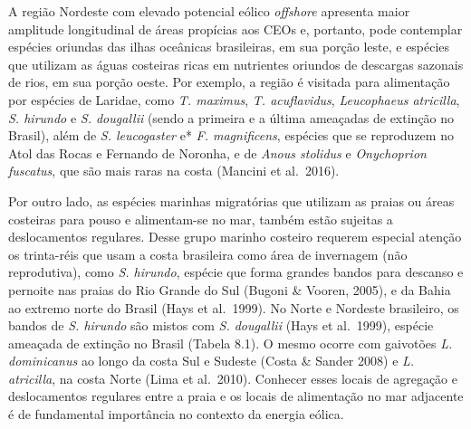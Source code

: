\documentclass[
  oneside]{scrbook}
\begin{document}
A região Nordeste com elevado potencial eólico \emph{offshore} apresenta maior amplitude longitudinal de áreas propícias aos CEOs e, portanto, pode contemplar espécies oriundas das ilhas oceânicas brasileiras, em sua porção leste, e espécies que utilizam as águas costeiras ricas em nutrientes oriundos de descargas sazonais de rios, em sua porção oeste. Por exemplo, a região é visitada para alimentação por espécies de Laridae, como \emph{T. maximus}, \emph{T. acuflavidus}, \emph{Leucophaeus atricilla}, \emph{S. hirundo} e \emph{S. dougallii} (sendo a primeira e a última ameaçadas de extinção no Brasil), além de \emph{S. leucogaster} e* \emph{F. magnificens}, espécies que se reproduzem no Atol das Rocas e Fernando de Noronha, e de \emph{Anous stolidus} e \emph{Onychoprion fuscatus}, que são mais raras na costa (Mancini et al.~2016).

Por outro lado, as espécies marinhas migratórias que utilizam as praias ou áreas costeiras para pouso e alimentam-se no mar, também estão sujeitas a deslocamentos regulares. Desse grupo marinho costeiro requerem especial atenção os trinta-réis que usam a costa brasileira como área de invernagem (não reprodutiva), como \emph{S. hirundo}, espécie que forma grandes bandos para descanso e pernoite nas praias do Rio Grande do Sul (Bugoni \& Vooren, 2005), e da Bahia ao extremo norte do Brasil (Hays et al.~1999). No Norte e Nordeste brasileiro, os bandos de \emph{S. hirundo} são mistos com \emph{S. dougallii} (Hays et al.~1999), espécie ameaçada de extinção no Brasil (Tabela 8.1). O mesmo ocorre com gaivotões \emph{L. dominicanus} ao longo da costa Sul e Sudeste (Costa \& Sander 2008) e \emph{L. atricilla}, na costa Norte (Lima et al.~2010). Conhecer esses locais de agregação e deslocamentos regulares entre a praia e os locais de alimentação no mar adjacente é de fundamental importância no contexto da energia eólica.
\end{document}
